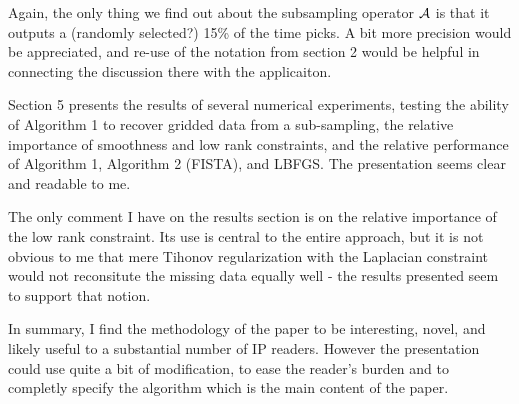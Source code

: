 Again, the only thing we find out about the subsampling operator ${\cal A}$ is that it outputs a (randomly selected?) 15\% of the time picks. A bit more precision would be appreciated, and re-use of the notation from section 2 would be helpful in connecting the discussion there with the applicaiton.

Section 5 presents the results of several numerical experiments, testing the ability of Algorithm 1 to recover gridded data from a sub-sampling, the relative importance of smoothness and low rank constraints, and the relative performance of Algorithm 1, Algorithm 2 (FISTA), and LBFGS. The presentation seems clear and readable to me.

The only comment I have on the results section is on the relative importance of the low rank constraint. Its use is central to the entire approach, but it is not obvious to me that mere Tihonov regularization with the Laplacian constraint would not reconsitute the missing data equally well - the results presented seem to support that notion.

In summary, I find the methodology of the paper to be interesting, novel, and likely useful to a substantial number of IP readers. However the presentation could use quite a bit of modification, to ease the reader's burden and to completly specify the algorithm which is the main content of the paper.

